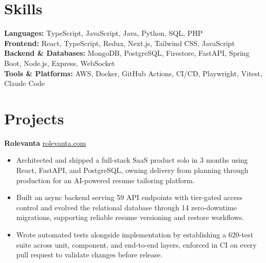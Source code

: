 \documentclass[11pt]{article}       %
\begin{document}
\vspace{-10.5pt}

\section*{Skills}
\textbf{Languages:} TypeScript, JavaScript, Java, Python, SQL, PHP \\
\textbf{Frontend:} React, TypeScript, Redux, Next.js, Tailwind CSS, JavaScript \\
\textbf{Backend \& Databases:} MongoDB, PostgreSQL, Firestore, FastAPI, Spring Boot, Node.js, Express, WebSocket \\
\textbf{Tools \& Platforms:} AWS, Docker, GitHub Actions, CI/CD, Playwright, Vitest, Claude Code
\vspace{-5pt}






\section*{Projects}
\textbf{Rolevanta} \hfill \href{https://rolevanta.com}{rolevanta.com} \\
\vspace{-9pt}
\begin{itemize}
  \item Architected and shipped a full-stack SaaS product solo in 3 months using React, FastAPI, and PostgreSQL, owning delivery from planning through production for an AI-powered resume tailoring platform.
  \item Built an async backend serving 59 API endpoints with tier-gated access control and evolved the relational database through 14 zero-downtime migrations, supporting reliable resume versioning and restore workflows.
  \item Wrote automated tests alongside implementation by establishing a 620-test suite across unit, component, and end-to-end layers, enforced in CI on every pull request to validate changes before release.
\end{itemize}
\end{document}

